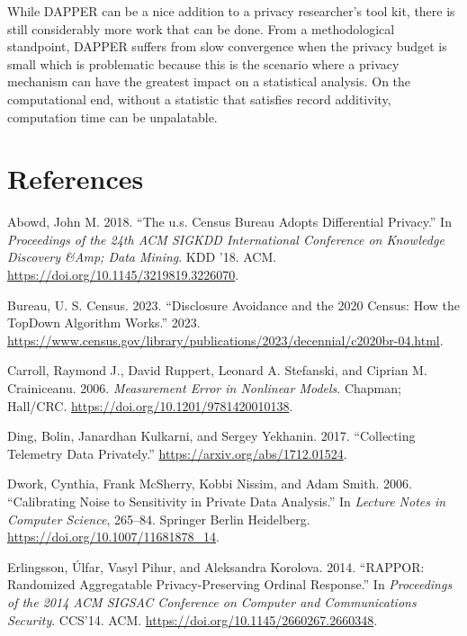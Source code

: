 While DAPPER can be a nice addition to a privacy researcher's tool kit, there
is still considerably more work that can be done. From a methodological standpoint,
DAPPER suffers from slow convergence when the privacy budget is small which is problematic
because this is the scenario where a privacy mechanism can have the greatest impact
on a statistical analysis. On the computational end, without a statistic that satisfies
record additivity, computation time can be unpalatable.

\hypertarget{references}{%
\section*{References}\label{references}}

\hypertarget{refs}{}
\begin{CSLReferences}{1}{0}
\leavevmode{}%
Abowd, John M. 2018. {``The u.s. Census Bureau Adopts Differential Privacy.''} In \emph{Proceedings of the 24th ACM SIGKDD International Conference on Knowledge Discovery \&Amp; Data Mining}. KDD '18. ACM. \url{https://doi.org/10.1145/3219819.3226070}.

\leavevmode{}%
Bureau, U. S. Census. 2023. {``Disclosure Avoidance and the 2020 Census: How the TopDown Algorithm Works.''} 2023. \url{https://www.census.gov/library/publications/2023/decennial/c2020br-04.html}.

\leavevmode{}%
Carroll, Raymond J., David Ruppert, Leonard A. Stefanski, and Ciprian M. Crainiceanu. 2006. \emph{Measurement Error in Nonlinear Models}. Chapman; Hall/CRC. \url{https://doi.org/10.1201/9781420010138}.

\leavevmode{}%
Ding, Bolin, Janardhan Kulkarni, and Sergey Yekhanin. 2017. {``Collecting Telemetry Data Privately.''} \url{https://arxiv.org/abs/1712.01524}.

\leavevmode{}%
Dwork, Cynthia, Frank McSherry, Kobbi Nissim, and Adam Smith. 2006. {``Calibrating Noise to Sensitivity in Private Data Analysis.''} In \emph{Lecture Notes in Computer Science}, 265--84. Springer Berlin Heidelberg. \url{https://doi.org/10.1007/11681878_14}.

\leavevmode{}%
Erlingsson, Úlfar, Vasyl Pihur, and Aleksandra Korolova. 2014. {``RAPPOR: Randomized Aggregatable Privacy-Preserving Ordinal Response.''} In \emph{Proceedings of the 2014 ACM SIGSAC Conference on Computer and Communications Security}. CCS'14. ACM. \url{https://doi.org/10.1145/2660267.2660348}.


\end{CSLReferences}
